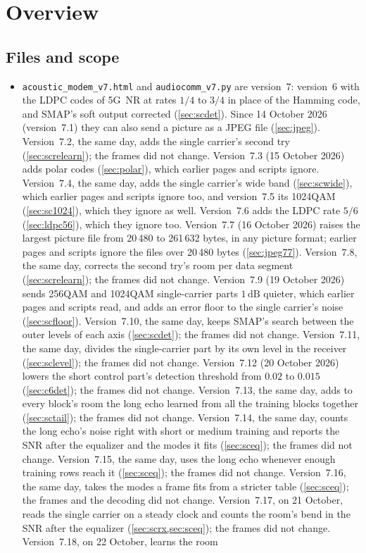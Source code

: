 \documentclass[11pt,a4paper]{article}
\newcommand{\dB}{\,\mathrm{dB}}
\newcommand{\code}[1]{\texttt{#1}}
\theoremstyle{remark}
\begin{document}
\tableofcontents
\newpage

\section{Overview}
\label{sec:overview}

\subsection{Files and scope}
\begin{itemize}
\item \code{acoustic\_modem\_v7.html} and \code{audiocomm\_v7.py} are version~7: version~6 with the LDPC codes of 5G~NR at rates $1/4$ to $3/4$ in place of the Hamming code, and SMAP's soft output corrected (\cref{sec:scdet}). Since 14 October 2026 (version~7.1) they can also send a picture as a JPEG file (\cref{sec:jpeg}). Version~7.2, the same day, adds the single carrier's second try (\cref{sec:screlearn}); the frames did not change. Version~7.3 (15 October 2026) adds polar codes (\cref{sec:polar}), which earlier pages and scripts ignore. Version~7.4, the same day, adds the single carrier's wide band (\cref{sec:scwide}), which earlier pages and scripts ignore too, and version~7.5 its 1024QAM (\cref{sec:sc1024}), which they ignore as well. Version~7.6 adds the LDPC rate $5/6$ (\cref{sec:ldpc56}), which they ignore too. Version~7.7 (16 October 2026) raises the largest picture file from 20\,480 to 261\,632 bytes, in any picture format; earlier pages and scripts ignore the files over 20\,480 bytes (\cref{sec:jpeg77}). Version~7.8, the same day, corrects the second try's room per data segment (\cref{sec:screlearn}); the frames did not change. Version~7.9 (19 October 2026) sends 256QAM and 1024QAM single-carrier parts $1\dB$ quieter, which earlier pages and scripts read, and adds an error floor to the single carrier's noise (\cref{sec:scfloor}). Version~7.10, the same day, keeps SMAP's search between the outer levels of each axis (\cref{sec:scdet}); the frames did not change. Version~7.11, the same day, divides the single-carrier part by its own level in the receiver (\cref{sec:sclevel}); the frames did not change. Version~7.12 (20 October 2026) lowers the short control part's detection threshold from $0.02$ to $0.015$ (\cref{sec:c6det}); the frames did not change. Version~7.13, the same day, adds to every block's room the long echo learned from all the training blocks together (\cref{sec:sctail}); the frames did not change. Version~7.14, the same day, counts the long echo's noise right with short or medium training and reports the SNR after the equalizer and the modes it fits (\cref{sec:sceq}); the frames did not change. Version~7.15, the same day, uses the long echo whenever enough training rows reach it (\cref{sec:sceq}); the frames did not change. Version~7.16, the same day, takes the modes a frame fits from a stricter table (\cref{sec:sceq}); the frames and the decoding did not change. Version~7.17, on 21 October, reads the single carrier on a steady clock and counts the room's bend in the SNR after the equalizer (\cref{sec:scrx,sec:sceq}); the frames did not change. Version~7.18, on 22 October, learns the room 
\end{itemize}
\end{document}
